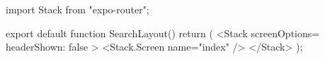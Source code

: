 import { Stack } from "expo-router";

export default function SearchLayout() {
  return (
    <Stack screenOptions={{ headerShown: false }}>
      <Stack.Screen name="index" />
    </Stack>
  );
}
